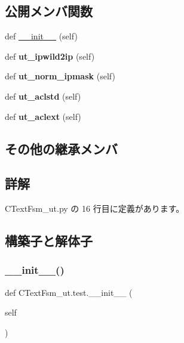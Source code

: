 \subsection*{公開メンバ関数}
\begin{DoxyCompactItemize}
\item 
def \mbox{\hyperlink{classCTextFsm__ut_1_1test_aa74780257a0e74f90ebdaf0982486dcd}{\+\_\+\+\_\+init\+\_\+\+\_\+}} (self)
\item 
\mbox{\label{classCTextFsm__ut_1_1test_abfd6d99d9070ada741bf9a49068410e3}} 
def {\bfseries ut\+\_\+ipwild2ip} (self)
\item 
\mbox{\label{classCTextFsm__ut_1_1test_ae49a6436f64799ac5ddd36c82f2434cc}} 
def {\bfseries ut\+\_\+norm\+\_\+ipmask} (self)
\item 
\mbox{\label{classCTextFsm__ut_1_1test_ac6a90c96246797df8507b02bfb78a7da}} 
def {\bfseries ut\+\_\+aclstd} (self)
\item 
\mbox{\label{classCTextFsm__ut_1_1test_a0cffef7367402f443f33b8cce902e2b7}} 
def {\bfseries ut\+\_\+aclext} (self)
\end{DoxyCompactItemize}
\subsection*{その他の継承メンバ}


\subsection{詳解}


 C\+Text\+Fsm\+\_\+ut.\+py の 16 行目に定義があります。



\subsection{構築子と解体子}
\mbox{\label{classCTextFsm__ut_1_1test_aa74780257a0e74f90ebdaf0982486dcd}} 
\subsubsection{\texorpdfstring{\_\_init\_\_()}{\_\_init\_\_()}}
{\footnotesize\ttfamily def C\+Text\+Fsm\+\_\+ut.\+test.\+\_\+\+\_\+init\+\_\+\+\_\+ (\begin{DoxyParamCaption}\item[{}]{self }\end{DoxyParamCaption})}

